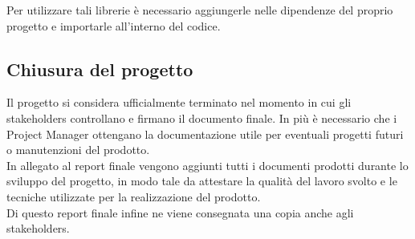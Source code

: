 Per utilizzare tali librerie è necessario aggiungerle nelle dipendenze del proprio progetto e importarle all'interno del codice.\\

\subsection{Chiusura del progetto}
Il progetto si considera ufficialmente terminato nel momento in cui gli stakeholders controllano e firmano il documento finale. 
In più è necessario che i Project Manager ottengano la documentazione utile per eventuali progetti futuri o manutenzioni del prodotto.\\

In allegato al report finale vengono aggiunti tutti i documenti prodotti durante lo sviluppo del progetto, in modo tale da
attestare la qualità del lavoro svolto e le tecniche utilizzate per la realizzazione del prodotto.\\

Di questo report finale infine ne viene consegnata una copia anche agli stakeholders.